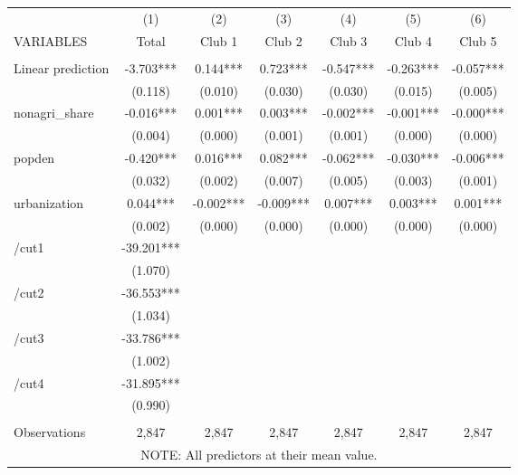 \begin{tabular}{lcccccc} \hline
 & (1) & (2) & (3) & (4) & (5) & (6) \\
VARIABLES & Total & Club 1 & Club 2 & Club 3 & Club 4 & Club 5 \\ \hline
 &  &  &  &  &  &  \\
Linear prediction & -3.703*** & 0.144*** & 0.723*** & -0.547*** & -0.263*** & -0.057*** \\
 & (0.118) & (0.010) & (0.030) & (0.030) & (0.015) & (0.005) \\
nonagri\_share & -0.016*** & 0.001*** & 0.003*** & -0.002*** & -0.001*** & -0.000*** \\
 & (0.004) & (0.000) & (0.001) & (0.001) & (0.000) & (0.000) \\
popden & -0.420*** & 0.016*** & 0.082*** & -0.062*** & -0.030*** & -0.006*** \\
 & (0.032) & (0.002) & (0.007) & (0.005) & (0.003) & (0.001) \\
urbanization & 0.044*** & -0.002*** & -0.009*** & 0.007*** & 0.003*** & 0.001*** \\
 & (0.002) & (0.000) & (0.000) & (0.000) & (0.000) & (0.000) \\
/cut1 & -39.201*** &  &  &  &  &  \\
 & (1.070) &  &  &  &  &  \\
/cut2 & -36.553*** &  &  &  &  &  \\
 & (1.034) &  &  &  &  &  \\
/cut3 & -33.786*** &  &  &  &  &  \\
 & (1.002) &  &  &  &  &  \\
/cut4 & -31.895*** &  &  &  &  &  \\
 & (0.990) &  &  &  &  &  \\
 &  &  &  &  &  &  \\
 Observations & 2,847 & 2,847 & 2,847 & 2,847 & 2,847 & 2,847 \\ \hline
\multicolumn{7}{c}{ NOTE: All predictors at their mean value.} \\
\end{tabular}
